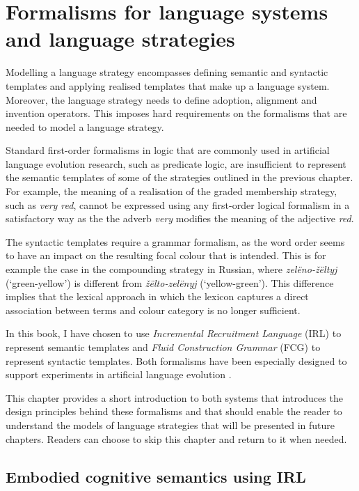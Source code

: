 \chapter{Formalisms for language systems and language strategies}
\label{s:formalisms}

Modelling a language strategy encompasses defining semantic and
syntactic templates and applying realised templates that make up a
language system. Moreover, the language strategy needs to define
adoption, alignment and invention operators. This imposes hard
requirements on the formalisms that are needed to model a language
strategy.

Standard first-order formalisms in logic that are commonly used in
artificial language evolution research, such as predicate logic, are
insufficient to represent the semantic templates of some of the
strategies outlined in the previous chapter. For example, the meaning
of a realisation of the graded membership strategy, such as \textit{very
red}, cannot be expressed using any first-order logical formalism in
a satisfactory way as the the adverb \textit{very} modifies the meaning of
the adjective \textit{red}.

The syntactic templates require a grammar formalism, as the word order
seems to have an impact on the resulting focal colour that is
intended.  This is for example the case in the compounding strategy in
Russian, where \textit{zel\"eno-\v z\"eltyj} (`green-yellow') is different
from \textit{\v z\"elto-zel\"enyj} (`yellow-green'). This difference implies
that the lexical approach in which the lexicon captures a direct
association between terms and colour category is no longer sufficient.

In this book, I have chosen to use \emph{Incremental Recruitment
  Language} (IRL) to represent semantic templates and \emph{Fluid
  Construction Grammar} (FCG) to represent syntactic templates. Both
formalisms have been especially designed to support experiments in
artificial language evolution \citep{loetzsch09understanding}.

This chapter provides a short introduction to both systems that
introduces the design principles behind these formalisms and that
should enable the reader to understand the models of language
strategies that will be presented in future chapters. Readers can
choose to skip this chapter and return to it when needed.

\section{Embodied cognitive semantics using IRL}
\label{s:irl}

